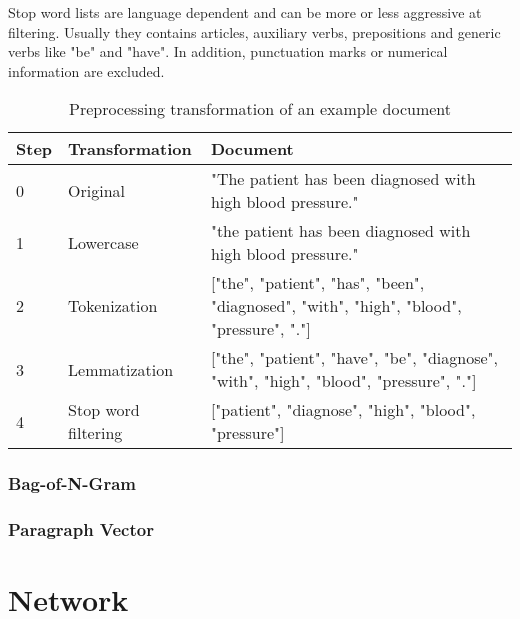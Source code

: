Stop word lists are language dependent and can be more or less aggressive at filtering.
Usually they contains articles, auxiliary verbs, prepositions and generic verbs like "be" and "have".
In addition, punctuation marks or numerical information are excluded.

\begin{table}[]
	\begin{tabularx}{\textwidth}{l l p{9.8cm}}
		\toprule
		\textbf{Step} & \textbf{Transformation} & \textbf{Document}                                                       \\ \midrule
		0             & Original       & "The patient has been diagnosed with high blood pressure." \\
		1             & Lowercase               & "the patient has been diagnosed with high blood pressure." \\
		2 & Tokenization  & {[}"the", "patient", "has", "been", "diagnosed", "with", "high", "blood", "pressure", "."{]} \\
		3 & Lemmatization & {[}"the", "patient", "have", "be", "diagnose", "with", "high", "blood", "pressure", "."{]}   \\
		4             & Stop word filtering     & {[}"patient", "diagnose", "high", "blood", "pressure"{]} \\ \bottomrule
	\end{tabularx}
	\caption{Preprocessing transformation of an example document}
	\label{tab:text-preprocessing}
\end{table}








\subsubsection{Bag-of-N-Gram}
\subsubsection{Paragraph Vector}

\section{Network}